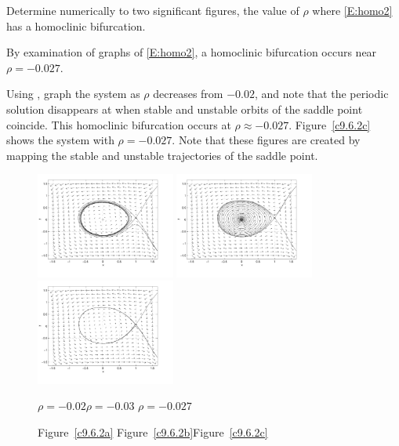\documentclass{ximera}
\begin{document}
\begin{computerExercise} \label{c9.6.2c}
Determine numerically to two significant figures, the value of $\rho$
where \eqref{E:homo2} has a homoclinic bifurcation. 

\begin{solution}

\ans By examination of {\pplane} graphs of \eqref{E:homo2}, a homoclinic
bifurcation occurs near $\rho = -0.027$.

\soln 
Using {\pplane}, graph the system as $\rho$ decreases from $-0.02$, and
note that the periodic solution disappears at when stable and unstable
orbits of the saddle point coincide.  This homoclinic bifurcation occurs
at $\rho \approx -0.027$.  Figure~\ref{c9.6.2c} shows the system with
$\rho = -0.027$.  Note that these figures are created by mapping the stable
and unstable trajectories of the saddle point.

\begin{figure}[htb]
                       \centerline{%
                       \includegraphics[width=1.8in]{exfigure/9-6-2a.pdf}
                       \includegraphics[width=1.8in]{exfigure/9-6-2b.pdf}
                       \includegraphics[width=1.8in]{exfigure/9-6-2c.pdf}}
		\centerline{$\rho = -0.02$\hspace{1.1in}$\rho = -0.03$
\hspace{1.1in}$\rho = -0.027$}
		\centerline{Figure~\ref{c9.6.2a}\hspace{1.2in}
Figure~\ref{c9.6.2b}\hspace{1.2in}Figure~\ref{c9.6.2c}}
\end{figure}

\end{solution}
\end{computerExercise} 
\end{document}
